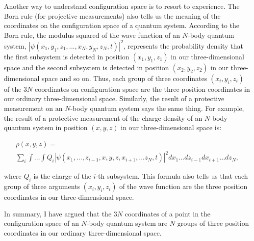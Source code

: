 Another way to understand configuration space is to resort to experience. The Born rule (for projective measurements) also tells us the meaning of the coordinates on the configuration space of a quantum system.
According to the Born rule,  the modulus squared of the wave function of an $N$-body quantum system, $|\psi(x_1,y_1,z_1, ..., x_N,y_N,z_N,t)|^2$, represents the probability density that the first subsystem is detected in position $(x_1,y_1,z_1)$ in our three-dimensional space and the second subsystem is detected in position $(x_2,y_2,z_2)$ in our three-dimensional space and so on. Thus, each group of three coordinates $(x_i, y_i, z_i)$ of the $3N$ coordinates on configuration space are the three position coordinates in our ordinary three-dimensional space. Similarly, the result of a protective measurement on an $N$-body quantum system says the same thing. For example, the result of a protective measurement of the charge density of an $N$-body quantum system in position $(x,y,z)$ in our three-dimensional space is:

\begin{multline}
 \rho(x,y,z)= \\ \sum_i{\int...\int{Q_i|\psi(x_1, ..., z_{i-1}, x, y, z, x_{i+1},... z_N, t)|^2dx_1 ...dz_{i-1}dx_{i+1}...dz_N}},
\end{multline}

\noindent where $Q_i$ is the charge of the $i$-th subsystem. This formula also tells us that each group of three arguments $(x_i, y_i, z_i)$ of the wave function are the three position coordinates in our three-dimensional space. 

In summary, I have argued that the $3N$ coordinates of a point in the configuration space of an $N$-body quantum system are $N$ groups of three position coordinates in our ordinary three-dimensional space. 

